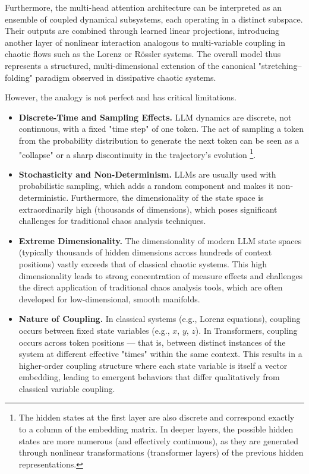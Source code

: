 \documentclass[a4paper,12pt]{article}
\begin{document}
Furthermore, the multi-head attention architecture can be interpreted as an ensemble of coupled dynamical subsystems, each operating in a distinct subspace. Their outputs are combined through learned linear projections, introducing another layer of nonlinear interaction analogous to multi-variable coupling in chaotic flows such as the Lorenz or Rössler systems. The overall model thus represents a structured, multi-dimensional extension of the canonical "stretching–folding" paradigm observed in dissipative chaotic systems.

However, the analogy is not perfect and has critical limitations.
\begin{itemize}
    \item \textbf{Discrete-Time and Sampling Effects.} LLM dynamics are discrete, not continuous, with a fixed "time step" of one token. The act of sampling a token from the probability distribution to generate the next token can be seen as a "collapse" or a sharp discontinuity in the trajectory's evolution \footnote{The hidden states at the first layer are also discrete and correspond exactly to a column of the embedding matrix. In deeper layers, the possible hidden states are more numerous (and effectively continuous), as they are generated through nonlinear transformations (transformer layers) of the previous hidden representations.}.
    \item \textbf{Stochasticity and Non-Determinism.} LLMs are usually used with probabilistic sampling, which adds a random component and makes it non-deterministic. Furthermore, the dimensionality of the state space is extraordinarily high (thousands of dimensions), which poses significant challenges for traditional chaos analysis techniques.
    \item \textbf{Extreme Dimensionality.}  
    The dimensionality of modern LLM state spaces (typically thousands of hidden dimensions across hundreds of context positions) vastly exceeds that of classical chaotic systems. This high dimensionality leads to strong concentration of measure effects and challenges the direct application of traditional chaos analysis tools, which are often developed for low-dimensional, smooth manifolds.

    \item \textbf{Nature of Coupling.}  
    In classical systems (e.g., Lorenz equations), coupling occurs between fixed state variables (e.g., $x$, $y$, $z$). In Transformers, coupling occurs across token positions — that is, between distinct instances of the system at different effective "times" within the same context. This results in a higher-order coupling structure where each state variable is itself a vector embedding, leading to emergent behaviors that differ qualitatively from classical variable coupling.


\end{itemize}
\end{document}
